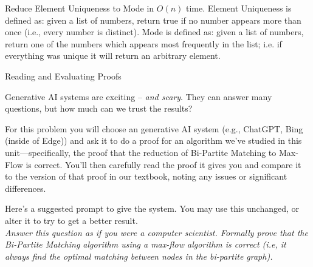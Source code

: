 \documentclass[10pt]{article}
\begin{document}
Reduce Element Uniqueness to Mode in $O(n)$ time.  Element Uniqueness is defined as: given a list of numbers, return true if no number appears more than once (i.e., every number is distinct).  Mode is defined as: given a list of numbers, return one of the numbers which appears most frequently in the list; i.e. if everything was unique it will return an arbitrary element.

\soln

\newpage

\begin{problem} Reading and Evaluating Proofs \end{problem}

Generative AI systems are exciting -- \textit{and scary}. They can answer many questions, but how much can we trust the results?

For this problem you will choose an generative AI system (e.g., ChatGPT, Bing (inside of Edge)) and ask it to do a proof for an algorithm we've studied in this unit---specifically, the proof that the reduction of Bi-Partite Matching to Max-Flow is correct. You'll then carefully read the proof it gives you and compare it to the version of that proof in our textbook, noting any issues or significant differences. 

Here's a suggested prompt to give the system. You may use this unchanged, or alter it to try to get a better result.
\\
\textit{Answer this question as if you were a computer scientist. Formally prove that the Bi-Partite Matching algorithm using a max-flow algorithm is correct (i.e, it always find the optimal matching between nodes in the bi-partite graph).}
\end{document}
